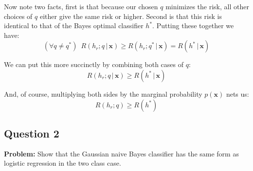 \documentclass{article}
\renewcommand{\vec}[1]{\mathbf{#1}}
\begin{document}
Now note two facts, first is that because our chosen $q$ minimizes the risk, all other choices of $q$ either give the same risk or higher. Second is that this risk is identical to that of the Bayes optimal classifier $h^*$. Putting these together we have:
$$\left(\forall q\not=q^*\right)\,\,\,R(h_r;q\,|\,\vec x)\ge R(h_r;q^*\,|\,\vec x)=R(h^*\,|\,\vec x)$$

We can put this more succinctly by combining both cases of $q$:
$$R(h_r;q\,|\,\vec x)\ge R(h^*\,|\,\vec x)$$

And, of course, multiplying both sides by the marginal probability $p(\vec x)$ nets us:
$$R(h_r;q)\ge R(h^*)$$

\subsection*{Question 2}
\noindent\textbf{Problem:} Show that the Gaussian naive Bayes classifier has the same form as logistic regression in the two class case.
\bigskip
\end{document}
